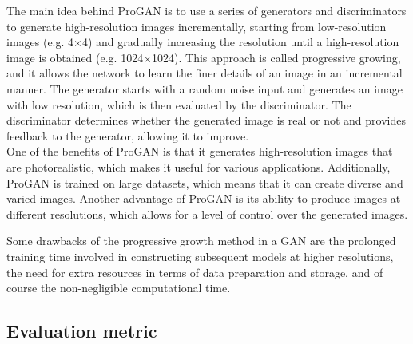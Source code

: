 \noindent The main idea behind ProGAN is to use a series of generators and discriminators to generate high-resolution images incrementally, starting from low-resolution images (e.g. 4×4) and gradually increasing the resolution until a high-resolution image is obtained (e.g. 1024×1024). This approach is called progressive growing, and it allows the network to learn the finer details of an image in an incremental manner. The generator starts with a random noise input and generates an image with low resolution, which is then evaluated by the discriminator. The discriminator determines whether the generated image is real or not and provides feedback to the generator, allowing it to improve. \\

\noindent One of the benefits of ProGAN is that it generates high-resolution images that are photorealistic, which makes it useful for various applications. Additionally, ProGAN is trained on large datasets, which means that it can create diverse and varied images.
Another advantage of ProGAN is its ability to produce images at different resolutions, which allows for a level of control over the generated images.

\noindent Some drawbacks of the progressive growth method in a GAN are the prolonged training time involved in constructing subsequent models at higher resolutions, the need for extra resources in terms of data preparation and storage, and of course the non-negligible computational time.
%
%
%
\subsection{Evaluation metric}
